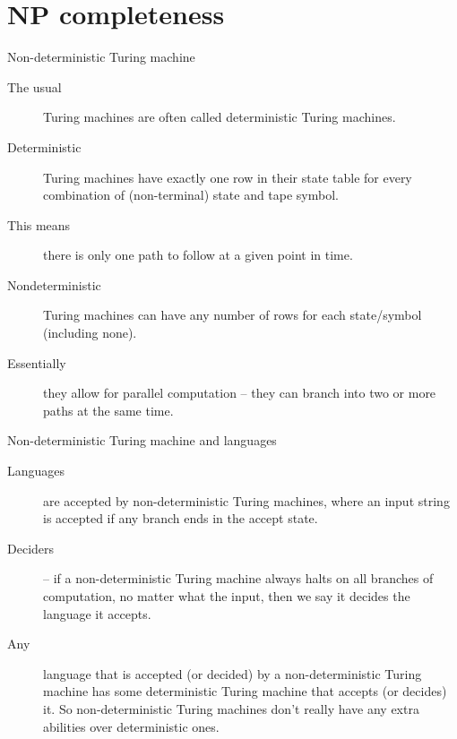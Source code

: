 


\section{NP completeness}


\begin{frame}{Non-deterministic Turing machine}
  \begin{description}
    \item[The usual] Turing machines are often called deterministic Turing machines.
    \item[Deterministic] Turing machines have exactly one row in their state table for every combination of (non-terminal) state and tape symbol.
    \item[This means] there is only one path to follow at a given point in time.
    \item[Nondeterministic] Turing machines can have any number of rows for each state/symbol (including none).
    \item[Essentially] they allow for parallel computation -- they can branch into two or more paths at the same time.
  \end{description}
\end{frame}


\begin{frame}{Non-deterministic Turing machine and languages}
  \begin{description}
    \item[Languages] are accepted by non-deterministic Turing machines, where an input string is accepted if any branch ends in the accept state.
    \item[Deciders] -- if a non-deterministic Turing machine always halts on all branches of computation, no matter what the input, then we say it decides the language it accepts.
    \item[Any] language that is accepted (or decided) by a non-deterministic Turing machine has some deterministic Turing machine that accepts (or decides) it. So non-deterministic Turing machines don't really have any extra abilities over deterministic ones.
  \end{description}
\end{frame}


